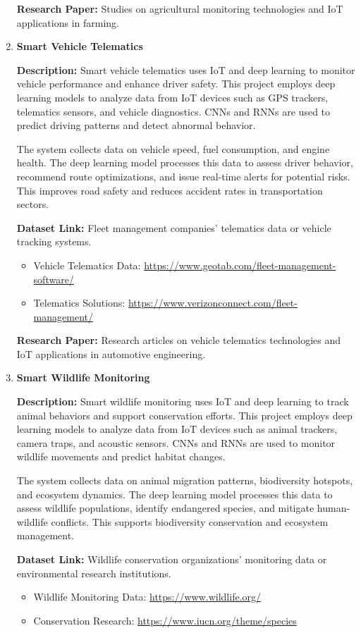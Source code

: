 \documentclass{article}
\begin{document}
\begin{enumerate}[label=\textbf{\arabic*.}, leftmargin=*]
\textbf{Research Paper:} Studies on agricultural monitoring technologies and IoT applications in farming.

\item \textbf{Smart Vehicle Telematics}

\textbf{Description:}
Smart vehicle telematics uses IoT and deep learning to monitor vehicle performance and enhance driver safety. This project employs deep learning models to analyze data from IoT devices such as GPS trackers, telematics sensors, and vehicle diagnostics. CNNs and RNNs are used to predict driving patterns and detect abnormal behavior.

The system collects data on vehicle speed, fuel consumption, and engine health. The deep learning model processes this data to assess driver behavior, recommend route optimizations, and issue real-time alerts for potential risks. This improves road safety and reduces accident rates in transportation sectors.

\textbf{Dataset Link:} Fleet management companies' telematics data or vehicle tracking systems.
\begin{itemize}
    \item Vehicle Telematics Data: \url{https://www.geotab.com/fleet-management-software/}
    \item Telematics Solutions: \url{https://www.verizonconnect.com/fleet-management/}
\end{itemize}

\textbf{Research Paper:} Research articles on vehicle telematics technologies and IoT applications in automotive engineering.

\item \textbf{Smart Wildlife Monitoring}

\textbf{Description:}
Smart wildlife monitoring uses IoT and deep learning to track animal behaviors and support conservation efforts. This project employs deep learning models to analyze data from IoT devices such as animal trackers, camera traps, and acoustic sensors. CNNs and RNNs are used to monitor wildlife movements and predict habitat changes.

The system collects data on animal migration patterns, biodiversity hotspots, and ecosystem dynamics. The deep learning model processes this data to assess wildlife populations, identify endangered species, and mitigate human-wildlife conflicts. This supports biodiversity conservation and ecosystem management.

\textbf{Dataset Link:} Wildlife conservation organizations' monitoring data or environmental research institutions.
\begin{itemize}
    \item Wildlife Monitoring Data: \url{https://www.wildlife.org/}
    \item Conservation Research: \url{https://www.iucn.org/theme/species}
\end{itemize}


\end{enumerate}
\end{document}
